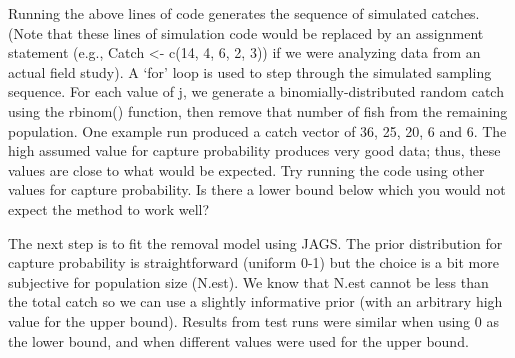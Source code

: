 \documentclass[
]{krantz}
\begin{document}
Running the above lines of code generates the sequence of simulated catches. (Note that these lines of simulation code would be replaced by an assignment statement (e.g., Catch \textless- c(14, 4, 6, 2, 3)) if we were analyzing data from an actual field study). A `for' loop is used to step through the simulated sampling sequence. For each value of j, we generate a binomially-distributed random catch using the rbinom() function, then remove that number of fish from the remaining population. One example run produced a catch vector of 36, 25, 20, 6 and 6. The high assumed value for capture probability produces very good data; thus, these values are close to what would be expected. Try running the code using other values for capture probability. Is there a lower bound below which you would not expect the method to work well?

The next step is to fit the removal model using JAGS. The prior distribution for capture probability is straightforward (uniform 0-1) but the choice is a bit more subjective for population size (N.est). We know that N.est cannot be less than the total catch so we can use a slightly informative prior (with an arbitrary high value for the upper bound). Results from test runs were similar when using 0 as the lower bound, and when different values were used for the upper bound.
\end{document}
